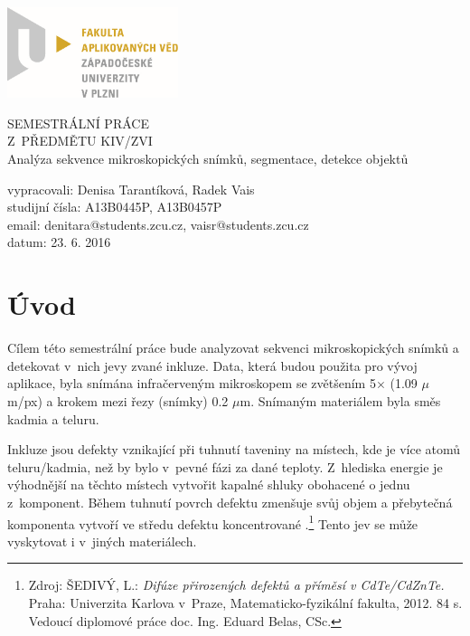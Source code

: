 \documentclass[12pt, a4paper]{report}
\begin{document}
	\begin{titlepage}
	\includegraphics[width=5cm,natwidth=601,natheight=314]{obrazky/logo.png}
		
	\vspace{4cm}
		\begin {center}
		{\Huge SEMESTRÁLNÍ PRÁCE\\ Z~PŘEDMĚTU KIV/ZVI\\}
		\vspace{1cm}
		{\huge Analýza sekvence mikroskopických snímků, segmentace, detekce objektů\\}
		\end {center}
	\vspace{6cm}
			
	\noindent vypracovali: Denisa Tarantíková, Radek Vais \\
				studijní čísla: A13B0445P, A13B0457P\\
				email:	denitara@students.zcu.cz, vaisr@students.zcu.cz\\
				datum:	23. 6. 2016
	\end{titlepage}

\tableofcontents

\chapter{Úvod}
	Cílem této semestrální práce bude analyzovat sekvenci mikroskopických snímků a detekovat v~nich jevy zvané inkluze. Data, která budou použita pro vývoj aplikace, byla snímána infračerveným mikroskopem se zvětšením 5$\times$ (1.09 $\mu$m/px) a krokem mezi řezy (snímky) 0.2 $\mu$m. Snímaným materiálem byla směs kadmia a teluru. 
	
	Inkluze jsou defekty vznikající při tuhnutí taveniny na místech, kde je více atomů teluru/kadmia, než by bylo v~pevné fázi za dané teploty. Z~hlediska energie je výhodnější na těchto místech vytvořit kapalné shluky obohacené o jednu z~komponent. Během tuhnutí povrch defektu zmenšuje svůj objem a přebytečná komponenta vytvoří ve středu defektu koncentrované .\footnote{	Zdroj: ŠEDIVÝ, L.: \emph{Difúze přirozených defektů a příměsí v CdTe/CdZnTe.} Praha: Univerzita Karlova v~Praze, Matematicko-fyzikální fakulta, 2012. 84 s. Vedoucí diplomové práce doc. Ing. Eduard Belas, CSc.} Tento jev se může vyskytovat i v~jiných materiálech. 
\end{document}
